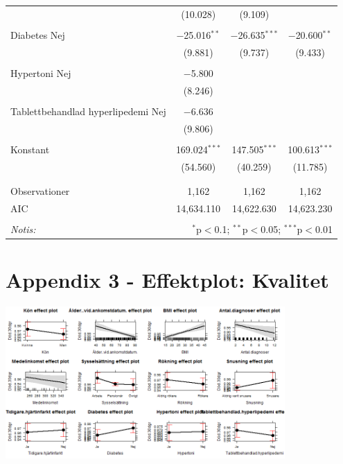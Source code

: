\begin{table}[!htbp]
\begin{tabular}{@{\extracolsep{5pt}}lccc}
  & (10.028) & (9.109) &  \\ 
  & & & \\ 
 Diabetes Nej & $-$25.016$^{**}$ & $-$26.635$^{***}$ & $-$20.600$^{**}$ \\ 
  & (9.881) & (9.737) & (9.433) \\ 
  & & & \\ 
 Hypertoni Nej & $-$5.800 &  &  \\ 
  & (8.246) &  &  \\ 
  & & & \\ 
 Tablettbehandlad hyperlipedemi Nej & $-$6.636 &  &  \\ 
  & (9.806) &  &  \\ 
  & & & \\ 
 Konstant & 169.024$^{***}$ & 147.505$^{***}$ & 100.613$^{***}$ \\ 
  & (54.560) & (40.259) & (11.785) \\ 
  & & & \\ 
\hline \\[-1.8ex] 
Observationer & 1,162 & 1,162 & 1,162 \\ 
AIC & 14,634.110 & 14,622.630 & 14,623.230 \\ 
\hline 
\hline \\[-1.8ex] 
\textit{Notis:}  & \multicolumn{3}{r}{$^{*}$p$<$0.1; $^{**}$p$<$0.05; $^{***}$p$<$0.01} \\ 
\end{tabular} 
\end{table} 


\section{Appendix 3 - Effektplot: Kvalitet}
\noindent\begin{minipage}{\textwidth}

\centering
\includegraphics[width=0.8\textwidth]{effektmortalitet.png}
\end{minipage} 
\newpage
